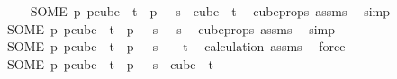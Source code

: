 \begin{isabellebody}
{\isacharminus}{\kern0pt}\isanewline
\ \ \isamarkupfalse%
\ {\isacharasterisk}{\kern0pt}{\isacharcolon}{\kern0pt}\ {\isachardoublequoteopen}{\isacharparenleft}{\kern0pt}SOME\ p{\isachardot}{\kern0pt}\ p{\isasymin}cube\ {}\ {\isacharparenleft}{\kern0pt}t{\isacharplus}{\kern0pt}{}{\isacharparenright}{\kern0pt}\ {\isasymand}\ p\ {}\ {\isacharequal}{\kern0pt}\ s{\isacharparenright}{\kern0pt}\ {\isasymin}\ cube\ {}\ {\isacharparenleft}{\kern0pt}t{\isacharplus}{\kern0pt}{}{\isacharparenright}{\kern0pt}{\isachardoublequoteclose}\ \isamarkupfalse%
\ cube{\isacharunderscore}{\kern0pt}props\ assms\ \isamarkupfalse%
\ simp\isanewline
\ \ \isamarkupfalse%
\ \isamarkupfalse%
\ {\isachardoublequoteopen}{\isacharparenleft}{\kern0pt}SOME\ p{\isachardot}{\kern0pt}\ p{\isasymin}cube\ {}\ {\isacharparenleft}{\kern0pt}t{\isacharplus}{\kern0pt}{}{\isacharparenright}{\kern0pt}\ {\isasymand}\ p\ {}\ {\isacharequal}{\kern0pt}\ s{\isacharparenright}{\kern0pt}\ {}\ {\isacharequal}{\kern0pt}\ s{\isachardoublequoteclose}\ \isamarkupfalse%
\ cube{\isacharunderscore}{\kern0pt}props\ assms\ \isamarkupfalse%
\ simp\isanewline
\ \ \isamarkupfalse%
\isanewline
\ \ \isacommand{{\isacharbraceleft}{\kern0pt}}\isamarkupfalse%
\isanewline
\ \ \ \ \isamarkupfalse%
\ {\isachardoublequoteopen}{\isacharparenleft}{\kern0pt}SOME\ p{\isachardot}{\kern0pt}\ p{\isasymin}cube\ {}\ {\isacharparenleft}{\kern0pt}t{\isacharplus}{\kern0pt}{}{\isacharparenright}{\kern0pt}\ {\isasymand}\ p\ {}\ {\isacharequal}{\kern0pt}\ s{\isacharparenright}{\kern0pt}\ {\isacharbackquote}{\kern0pt}\ {\isacharbraceleft}{\kern0pt}{\isachardot}{\kern0pt}{\isachardot}{\kern0pt}{\isacharless}{\kern0pt}{}{\isacharbraceright}{\kern0pt}\ {\isasymsubseteq}\ {\isacharbraceleft}{\kern0pt}{\isachardot}{\kern0pt}{\isachardot}{\kern0pt}{\isacharless}{\kern0pt}t{\isacharbraceright}{\kern0pt}{\isachardoublequoteclose}\ \isamarkupfalse%
\ calculation\ assms\ \isamarkupfalse%
\ force\isanewline
\ \ \ \ \isamarkupfalse%
\ \isamarkupfalse%
\ {\isachardoublequoteopen}{\isacharparenleft}{\kern0pt}SOME\ p{\isachardot}{\kern0pt}\ p{\isasymin}cube\ {}\ {\isacharparenleft}{\kern0pt}t{\isacharplus}{\kern0pt}{}{\isacharparenright}{\kern0pt}\ {\isasymand}\ p\ {}\ {\isacharequal}{\kern0pt}\ s{\isacharparenright}{\kern0pt}\ {\isasymin}\ cube\ {}\ t{\isachardoublequoteclose}\ \isamarkupfalse%

\end{isabellebody}
